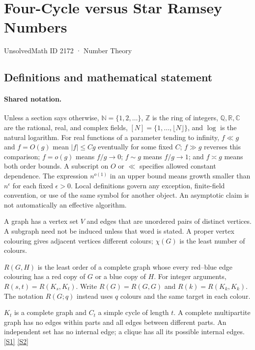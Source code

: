 \documentclass[11pt,a4paper]{article}
\newcommand{\N}{\mathbb{N}}
\newcommand{\Z}{\mathbb{Z}}
\newcommand{\Q}{\mathbb{Q}}
\newcommand{\R}{\mathbb{R}}
\newcommand{\C}{\mathbb{C}}
\newcommand{\sref}[2]{\hyperlink{source:#1:#2}{[S#2]}}
\begin{document}

\setcounter{section}{2171}

\section{Four-Cycle versus Star Ramsey Numbers}\label{2172}

{\small\sffamily UnsolvedMath ID 2172 · Number Theory}

\subsection{Definitions and mathematical statement}

\paragraph{Shared notation.}Unless a section says otherwise, $\N=\{1,2,\ldots\}$,
$\Z$ is the ring of integers, $\Q,\R,\C$ are the rational, real, and complex
fields, $[N]=\{1,\ldots,\lfloor N\rfloor\}$, and $\log$ is the natural
logarithm. For real functions of a parameter tending to infinity,
$f\ll g$ and $f=O(g)$ mean $|f|\leq Cg$ eventually for some fixed $C$;
$f\gg g$ reverses this comparison; $f=o(g)$ means $f/g\to0$;
$f\sim g$ means $f/g\to1$; and $f\asymp g$ means both order bounds.
A subscript on $O$ or $\ll$ specifies allowed constant dependence.
The expression $n^{o(1)}$ in an upper bound means growth smaller than
$n^\epsilon$ for each fixed $\epsilon>0$. Local definitions govern any
exception, finite-field convention, or use of the same symbol for another
object. An asymptotic claim is not automatically an effective algorithm.



A graph has a vertex set $V$ and edges that are unordered pairs of distinct vertices. A subgraph need not be induced unless that word is stated. A proper vertex colouring gives adjacent vertices different colours; $\chi(G)$ is the least number of colours.

$R(G,H)$ is the least order of a complete graph whose every red--blue edge colouring has a red copy of $G$ or a blue copy of $H$. For integer arguments, $R(s,t)=R(K_s,K_t)$. Write $R(G)=R(G,G)$ and $R(k)=R(K_k,K_k)$. The notation $R(G;q)$ instead uses $q$ colours and the same target in each colour.

$K_t$ is a complete graph and $C_t$ a simple cycle of length $t$. A complete multipartite graph has no edges within parts and all edges between different parts. An independent set has no internal edge; a clique has all its possible internal edges. \sref{2172}{1} \sref{2172}{2}
\end{document}
